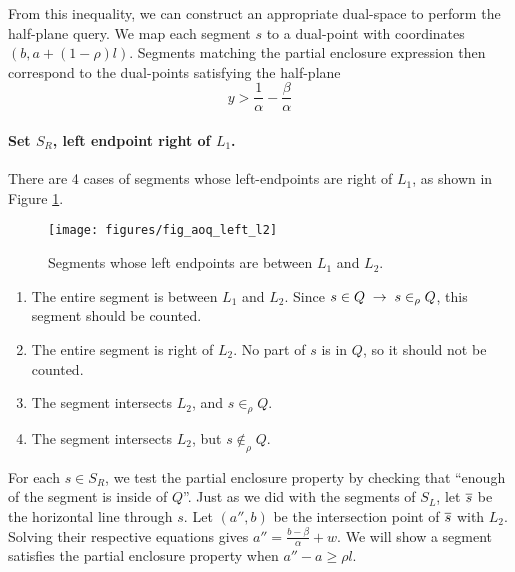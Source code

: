 From this inequality, we can construct an appropriate dual-space to perform the half-plane query. We map each segment $s$ to a dual-point with coordinates $(b, a + (1-\rho)l)$. 
Segments matching the partial enclosure expression then correspond to the dual-points satisfying the half-plane
\[
y > \frac{1}{\alpha} - \frac{\beta}{\alpha}
\]


\paragraph{Set $S_R$, left endpoint right of $L_1$.}
There are 4 cases of segments whose left-endpoints are right of $L_1$, as shown in Figure \ref{fig:slabs:one:aoq_left_l2}.

\begin{figure}[t]
\begin{center}
  \texttt{[image: figures/fig\_aoq\_left\_l2]}
  \caption{Segments whose left endpoints are between $L_1$ and $L_2$.}
  \label{fig:slabs:one:aoq_left_l2}
\end{center}
\end{figure}


\begin{enumerate}
 \item The entire segment is between $L_1$ and $L_2$. Since $s \in Q \;\rightarrow\; s \in_\rho Q$, this segment should be counted.

 \item The entire segment is right of $L_2$. No part of $s$ is in $Q$, so it should not be counted.

 \item The segment intersects $L_2$, and $s \in_\rho Q$.

 \item The segment intersects $L_2$, but $s \not \in_\rho Q$.

\end{enumerate}

For each $s \in S_R$, we test the partial enclosure property by checking that ``enough of the segment is inside of $Q$''.  Just as we did with the segments of $S_L$, let $\overline{s}$ be the horizontal line through $s$.  Let $(a'', b)$ be the intersection point of $\overline{s}$ with $L_2$. Solving their respective equations gives $a'' = \frac{b - \beta}{\alpha} + w$.  We will show a segment satisfies the partial enclosure property when $a'' - a \geq \rho l$.

